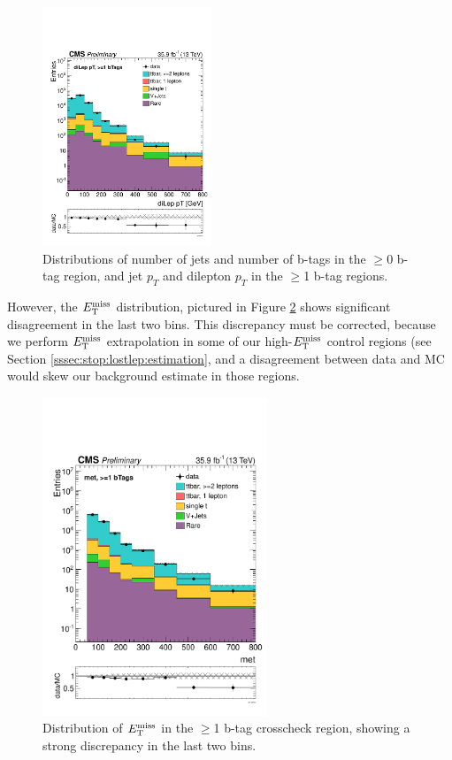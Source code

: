 \begin{figure}[htbp]
\includegraphics[width=0.45\textwidth]{figures/emuRegion_dilepPt.pdf}
\caption{Distributions of number of jets and number of b-tags in the
  $\geq$0 b-tag region, and jet $p_T$
  and dilepton $p_T$ in the $\geq$1 b-tag regions.}
\label{fig:emu:kinematics}
\end{figure}

However, the $E_\text{T}^\text{miss}$ distribution, pictured in Figure \ref{fig:emu:met}
shows significant disagreement in the last two bins. This discrepancy
must be corrected, because we perform $E_\text{T}^\text{miss}$ extrapolation in some of
our high-$E_\text{T}^\text{miss}$ control regions (see Section
\ref{sssec:stop:lostlep:estimation}, and a disagreement between data
and MC would skew our background estimate in those regions.

\begin{figure}[htbp]
\centering
\includegraphics[width=0.6\textwidth]{figures/emuRegion_met.pdf}
\caption{Distribution of $E_\text{T}^\text{miss}$ in the $\geq$1 b-tag crosscheck
  region, showing a strong discrepancy in the last two bins.}
\label{fig:emu:met}
\end{figure}

